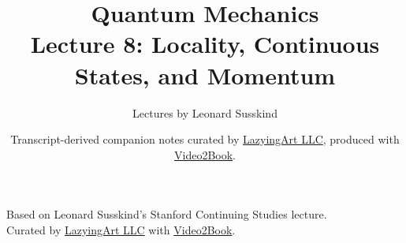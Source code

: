 \documentclass[11pt,oneside]{book}
\begin{document}
\frontmatter
\title{Quantum Mechanics\\Lecture 8: Locality, Continuous States, and Momentum}
\author{Lectures by Leonard Susskind}
\date{Transcript-derived companion notes curated by \href{https://lazying.art}{LazyingArt LLC}, produced with \href{https://github.com/lachlanchen/Video2Book}{Video2Book}.}
\maketitle
\begin{center}
\small Based on Leonard Susskind's Stanford Continuing Studies lecture.\\
Curated by \href{https://lazying.art}{LazyingArt LLC} with \href{https://github.com/lachlanchen/Video2Book}{Video2Book}.
\end{center}
\clearpage
\mainmatter

\end{document}
